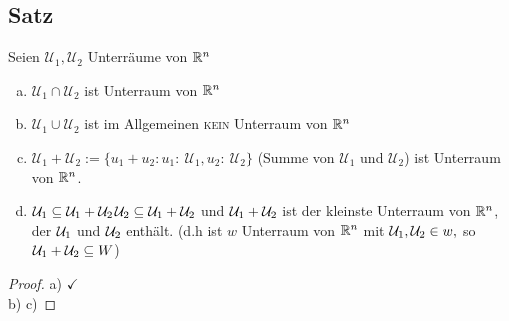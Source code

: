 \subsection{Satz}\label{sec:0.4}
Seien $\mathcal{U}_1,\mathcal{U}_2$ Unterräume von $\mathbb{R}^n$\\
\begin{enumerate}[a)]
\item $\mathcal{U}_1 \cap \mathcal{U}_2$ ist Unterraum von $\mathbb{R}^n$
\item $\mathcal{U}_1 \cup \mathcal{U}_2$ ist im Allgemeinen \textsc{kein} Unterraum von $\mathbb{R}^n$
\item $\mathcal{U}_1 + \mathcal{U}_2 := \{u_1 + u_2 : u_1:\: \mathcal{U}_1, u_2:\: \mathcal{U}_2\}$
(Summe von $\mathcal{U}_1$ und $\mathcal{U}_2$) ist Unterraum von $\mathbb{R}^n$.
\item $\mathcal{U}_1 \subseteq \mathcal{U}_1 + \mathcal{U}_2$\quad$\mathcal{U}_2 \subseteq \mathcal{U}_1+\mathcal{U}_2$ und $\mathcal{U}_1 + \mathcal{U}_2$ ist der kleinste Unterraum von $\mathbb{R}^n$, der $\mathcal{U}_1$ und $\mathcal{U}_2$ enthält. (d.h ist $w$ Unterraum von $\mathbb{R}^n$ mit $\mathcal{U}_1,\mathcal{U}_2 \in w,$ so $\mathcal{U}_1 + \mathcal{U}_2 \subseteq W$)
\end{enumerate}
\begin{proof}
a) $\checkmark$\\
b) %
c) %
\end{proof}
